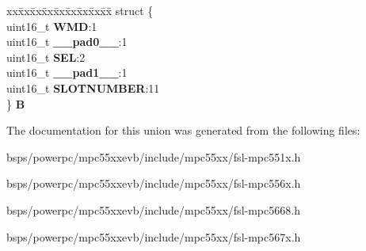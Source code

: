 \begin{DoxyCompactItemize}
\begin{tabbing}
\end{tabbing}\item 
\mbox{\label{unionuSSSR_ab1fc317104db76bf0b56892f9f471111}} 
\begin{tabbing}
xx\=xx\=xx\=xx\=xx\=xx\=xx\=xx\=xx\=\kill
struct \{\\
\>uint16\_t {\bfseries WMD}:1\\
\>uint16\_t {\bfseries \_\_pad0\_\_}:1\\
\>uint16\_t {\bfseries SEL}:2\\
\>uint16\_t {\bfseries \_\_pad1\_\_}:1\\
\>uint16\_t {\bfseries SLOTNUMBER}:11\\
\} {\bfseries B}\\

\end{tabbing}\end{DoxyCompactItemize}


The documentation for this union was generated from the following files\+:\begin{DoxyCompactItemize}
\item 
bsps/powerpc/mpc55xxevb/include/mpc55xx/fsl-\/mpc551x.\+h\item 
bsps/powerpc/mpc55xxevb/include/mpc55xx/fsl-\/mpc556x.\+h\item 
bsps/powerpc/mpc55xxevb/include/mpc55xx/fsl-\/mpc5668.\+h\item 
bsps/powerpc/mpc55xxevb/include/mpc55xx/fsl-\/mpc567x.\+h\end{DoxyCompactItemize}
